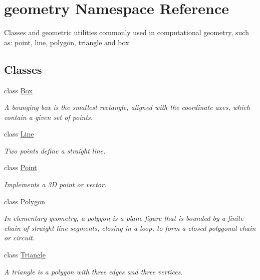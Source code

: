 \hypertarget{namespacegeometry}{}\section{geometry Namespace Reference}
\label{namespacegeometry}


Classes and geometric utilities commonly used in computational geometry, such as\+: point, line, polygon, triangle and box.  


\subsection*{Classes}
\begin{DoxyCompactItemize}
\item 
class \hyperlink{classgeometry_1_1Box}{Box}
\begin{DoxyCompactList}\small\item\em A bounging box is the smallest rectangle, aligned with the coordinate axes, which contain a given set of points. \end{DoxyCompactList}\item 
class \hyperlink{classgeometry_1_1Line}{Line}
\begin{DoxyCompactList}\small\item\em Two points define a straight line. \end{DoxyCompactList}\item 
class \hyperlink{classgeometry_1_1Point}{Point}
\begin{DoxyCompactList}\small\item\em Implements a 3D point or vector. \end{DoxyCompactList}\item 
class \hyperlink{classgeometry_1_1Polygon}{Polygon}
\begin{DoxyCompactList}\small\item\em In elementary geometry, a polygon is a plane figure that is bounded by a finite chain of straight line segments, closing in a loop, to form a closed polygonal chain or circuit. \end{DoxyCompactList}\item 
class \hyperlink{classgeometry_1_1Triangle}{Triangle}
\begin{DoxyCompactList}\small\item\em A triangle is a polygon with three edges and three vertices. \end{DoxyCompactList}\end{DoxyCompactItemize}
